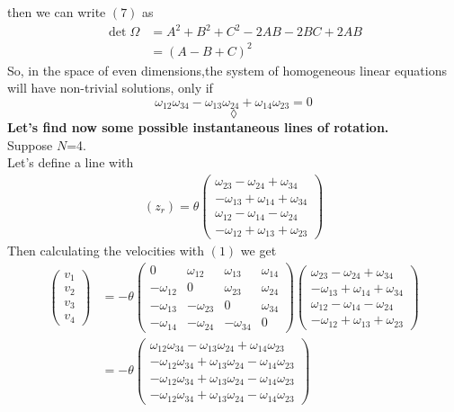 then we can write $(7)$ as 
\begin{align}
\det{\Omega}&= A^2+B^2+C^2 -2AB-2BC+2AB\\
&= \left(A-B+C\right)^2
\end{align}
So, in the space of even dimensions,the system of homogeneous linear equations will have non-trivial solutions, only if $$\omega_{12}\omega_{34}-\omega_{13}\omega_{24}+\omega_{14}\omega_{23}=0$$$$\lozenge$$
\textbf{Let's find now some possible instantaneous lines of rotation.}\\
Suppose $N$=4.\\
Let's define a line with 
\begin{align}
\left(z_r\right) = \theta\left( \begin{matrix}
\omega_{23}-\omega_{24}+\omega_{34}\\ 
-\omega_{13}+\omega_{14}+\omega_{34}\\ 
\omega_{12}-\omega_{14}-\omega_{24}\\ 
-\omega_{12}+\omega_{13}+\omega_{23}
\end{matrix}\right)
\end{align}
Then calculating the velocities with $(1)$ we get
\begin{align}
\left( \begin{matrix}v_1\\
v_2\\
v_3\\
v_4\end{matrix}\right) &= -\theta\left( \begin{matrix}
0&\omega_{12}&\omega_{13}&\omega_{14}\\
-\omega_{12}&0&\omega_{23}&\omega_{24}\\
-\omega_{13}&-\omega_{23}&0&\omega_{34}\\
-\omega_{14}&-\omega_{24}&-\omega_{34}&0
\end{matrix}\right)\left( \begin{matrix}
\omega_{23}-\omega_{24}+\omega_{34}\\ 
-\omega_{13}+\omega_{14}+\omega_{34}\\ 
\omega_{12}-\omega_{14}-\omega_{24}\\ 
-\omega_{12}+\omega_{13}+\omega_{23}
\end{matrix}\right)\\
&= -\theta\left( \begin{matrix}
\omega_{12}\omega_{34}-\omega_{13}\omega_{24}+\omega_{14}\omega_{23}\\ 
-\omega_{12}\omega_{34}+\omega_{13}\omega_{24}-\omega_{14}\omega_{23}\\
-\omega_{12}\omega_{34}+\omega_{13}\omega_{24}-\omega_{14}\omega_{23}\\
-\omega_{12}\omega_{34}+\omega_{13}\omega_{24}-\omega_{14}\omega_{23}
\end{matrix}\right)
\end{align}
